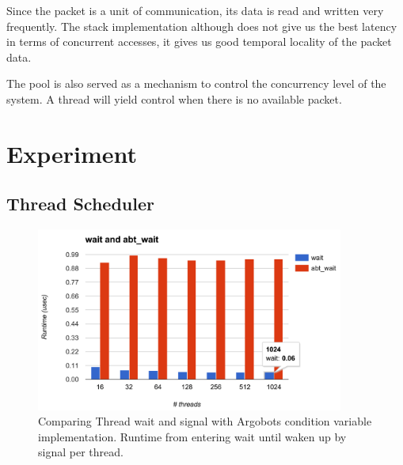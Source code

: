 \documentclass[11pt]{article}
\begin{document}
Since the packet is a unit of communication, its data is read and written very
frequently. The stack implementation although does not give us the best latency
in terms of concurrent accesses, it gives us good temporal locality of the
packet data.

The pool is also served as a mechanism to control the concurrency level of the system.
A thread will yield control when there is no available packet.

\section{Experiment}
\subsection{Thread Scheduler}
\begin{figure}[h]
  \centering 
  \includegraphics[width=0.9\textwidth]{fig/thread.png}
  \caption{Comparing Thread wait and signal with Argobots condition variable
  implementation. Runtime from entering wait until waken up by signal per thread.}

\end{figure}

\newpage
\end{document}
